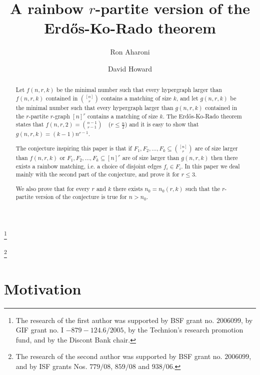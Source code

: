 \documentclass{amsart}
\theoremstyle{remark}
\begin{document}
\makeatletter

\makeatother
\author{Ron Aharoni}
\address{Department of Mathematics\\ Technion}
\thanks{\noindent The research of the first author was
supported by BSF grant no. $2006099$, by GIF grant no. I
$-879-124.6/2005$, by the Technion's research promotion fund, and by
the Discont Bank chair.}

\author{David Howard}
\address{Department of Mathematics\\ Colgate University}
\thanks{\noindent The research of the second author was
supported by BSF grant no. $2006099$, and by ISF grants Nos.
$779/08$, $859/08$ and $938/06$.
 }


\title{A rainbow $r$-partite version of the Erd\H{o}s-Ko-Rado theorem}



\begin{abstract}
Let $f(n,r,k)$ be the minimal number such that every hypergraph larger than $f(n,r,k)$ contained in $\binom{[n]}{r}$
contains a matching of size $k$,  and let $g(n,r,k)$ be the minimal number such that every hypergraph larger than $g(n,r,k)$
contained in the $r$-partite $r$-graph $[n]^{r}$ contains a matching of size $k$. The Erd\H{o}s-Ko-Rado theorem states
that  $f(n,r,2)=\binom{n-1}{r-1}$~~($r \le \frac{n}{2}$) and it is easy to show that $g(n,r,k)=(k-1)n^{r-1}$.

The conjecture inspiring this paper is that if
$F_1,F_2,\ldots,F_k\subseteq \binom{[n]}{r}$ are of size larger than
$f(n,r,k)$ or $F_1,F_2,\ldots,F_k\subseteq [n]^{r}$ are of size
larger than $g(n,r,k)$ then there exists a rainbow matching, i.e. a
choice of disjoint edges $f_i \in F_i$.  In this paper we deal
mainly with the second part of the conjecture, and prove it for
$r\le 3$.  \vspace{.1cm}

We also prove that for every $r$ and $k$ there exists $n_0=n_0(r,k)$
such that the $r$-partite version of the conjecture is true for
$n>n_0$.

 \end{abstract}

\maketitle

\section{Motivation}
\end{document}
